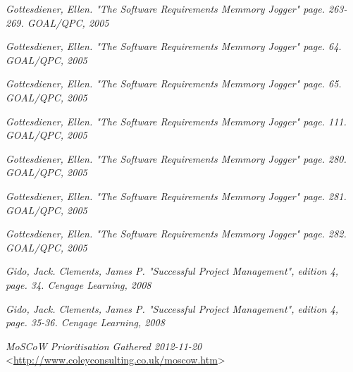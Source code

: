 \documentclass[a4paper]{article}
\begin{document}
\begin{thebibliography}{99}
 \emph{Gottesdiener, Ellen. \textsl{"The Software Requirements Memmory Jogger" page. 263-269}. GOAL/QPC, 2005}

 \emph{Gottesdiener, Ellen. \textsl{"The Software Requirements Memmory Jogger" page. 64}. GOAL/QPC, 2005}

 \emph{Gottesdiener, Ellen. \textsl{"The Software Requirements Memmory Jogger" page. 65}. GOAL/QPC, 2005}

 \emph{Gottesdiener, Ellen. \textsl{"The Software Requirements Memmory Jogger" page. 111}. GOAL/QPC, 2005}

 \emph{Gottesdiener, Ellen. \textsl{"The Software Requirements Memmory Jogger" page. 280}. GOAL/QPC, 2005}

 \emph{Gottesdiener, Ellen. \textsl{"The Software Requirements Memmory Jogger" page. 281}. GOAL/QPC, 2005}

 \emph{Gottesdiener, Ellen. \textsl{"The Software Requirements Memmory Jogger" page. 282}. GOAL/QPC, 2005}

 \emph{Gido, Jack. Clements, James P. \textsl{"Successful Project Management", edition 4, page. 34}. Cengage Learning, 2008}

 \emph{Gido, Jack. Clements, James P. \textsl{"Successful Project Management", edition 4, page. 35-36}. Cengage Learning, 2008}

 \emph{\textsl{MoSCoW Prioritisation} Gathered 2012-11-20} <\url{http://www.coleyconsulting.co.uk/moscow.htm}>

 

\end{thebibliography}
\end{document}
